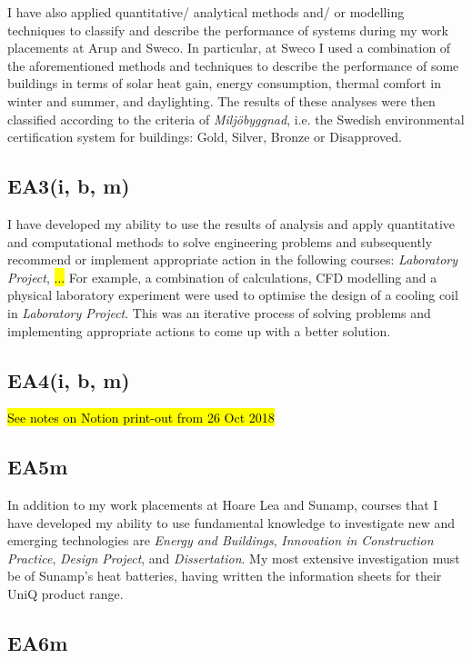 I have also applied quantitative/ analytical methods and/ or modelling techniques to classify and describe the performance of systems during my work placements at Arup and Sweco.
In particular, at Sweco I used a combination of the aforementioned methods and techniques to describe the performance of some buildings in terms of solar heat gain, energy consumption, thermal comfort in winter and summer, and daylighting.
The results of these analyses were then classified according to the criteria of \textit{Miljöbyggnad}, i.e. the Swedish environmental certification system for buildings: Gold, Silver, Bronze or Disapproved.


\subsection*{EA3(i, b, m)}

I have developed my ability to use the results of analysis and apply quantitative and computational methods to solve engineering problems and subsequently recommend or implement appropriate action in the following courses:
\textit{Laboratory Project},
\hl{...}
For example, a combination of calculations, CFD modelling and a physical laboratory experiment were used to optimise the design of a cooling coil in \textit{Laboratory Project}.
This was an iterative process of solving problems and implementing appropriate actions to come up with a better solution.


\subsection*{EA4(i, b, m)}

\hl{See notes on Notion print-out from 26 Oct 2018}


\subsection*{EA5m}

In addition to my work placements at Hoare Lea and Sunamp, courses that I have developed my ability to use fundamental knowledge to investigate new and emerging technologies are
\textit{Energy and Buildings},
\textit{Innovation in Construction Practice},
\textit{Design Project},
and \textit{Dissertation}.
My most extensive investigation must be of Sunamp's heat batteries, having written the information sheets for their UniQ product range.


\subsection*{EA6m}

